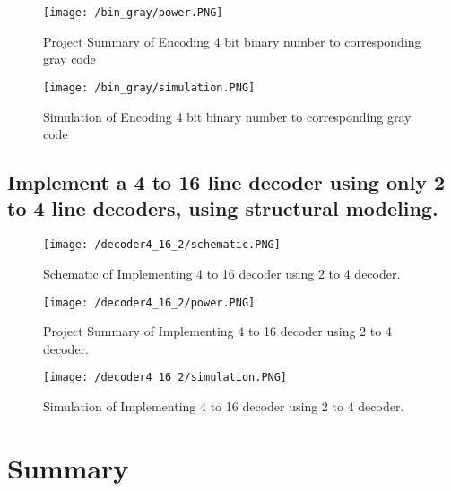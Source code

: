 \begin{figure}[h!]
\centering
\texttt{[image: /bin\_gray/power.PNG]}
\caption{Project Summary of Encoding 4 bit binary number to corresponding gray code}
\label{figure:2}


\end{figure}


\begin{figure}[h!]
\centering
\texttt{[image: /bin\_gray/simulation.PNG]}
\caption{Simulation of Encoding 4 bit binary number to corresponding gray code}
\label{figure:3}
\end{figure}


\FloatBarrier   \clearpage

\subsection{Implement a 4 to 16 line decoder using only 2 to 4 line decoders, using structural modeling.  }
\begin{figure}[h!]
\centering
\texttt{[image: /decoder4\_16\_2/schematic.PNG]}
\caption{Schematic of Implementing 4 to 16 decoder using 2 to 4 decoder.}
\label{figure:1}
\end{figure}


\begin{figure}[h!]
\centering
\texttt{[image: /decoder4\_16\_2/power.PNG]}
\caption{Project Summary of Implementing 4 to 16 decoder using 2 to 4 decoder.}
\label{figure:2}


\end{figure}


\begin{figure}[h!]
\centering
\texttt{[image: /decoder4\_16\_2/simulation.PNG]}
\caption{Simulation of Implementing 4 to 16 decoder using 2 to 4 decoder.}
\label{figure:3}
\end{figure}


\FloatBarrier   \clearpage

\section{Summary}

